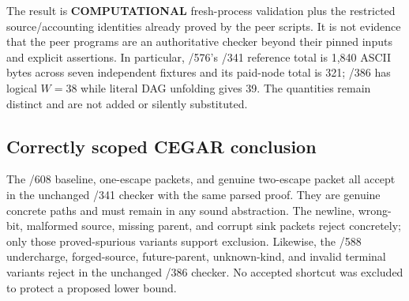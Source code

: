 \documentclass[11pt]{article}
\newcommand{\status}[1]{\textbf{#1}}
\begin{document}
The result is \status{COMPUTATIONAL} fresh-process validation plus the
restricted source/accounting identities already proved by the peer scripts.
It is not evidence that the peer programs are an authoritative checker beyond
their pinned inputs and explicit assertions.  In particular, /576's /341
reference total is 1,840 ASCII bytes across seven independent fixtures and
its paid-node total is 321; /386 has logical $W=38$ while literal DAG
unfolding gives 39.  The quantities remain distinct and are not added or
silently substituted.

\subsection{Correctly scoped CEGAR conclusion}
The /608 baseline, one-escape packets, and genuine two-escape packet all
accept in the unchanged /341 checker with the same parsed proof.  They are
genuine concrete paths and must remain in any sound abstraction.  The newline,
wrong-bit, malformed source, missing parent, and corrupt sink packets reject
concretely; only those proved-spurious variants support exclusion.  Likewise,
the /588 undercharge, forged-source, future-parent, unknown-kind, and invalid
terminal variants reject in the unchanged /386 checker.  No accepted shortcut
was excluded to protect a proposed lower bound.
\end{document}
